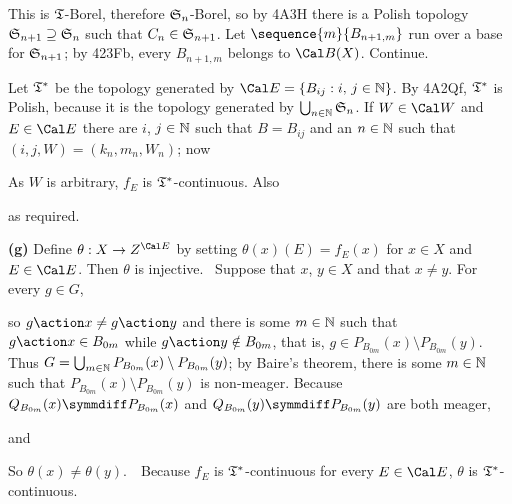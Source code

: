 {

\noindent This is $\frak T$-Borel, therefore $\frak S_n$-Borel, so by
4A3H there is a Polish topology $\frak S_{n+1}\supseteq\frak S_n$ such
that $C_n\in\frak S_{n+1}$.   Let $\sequence{m}{B_{n+1,m}}$ run over a
base for $\frak S_{n+1}$;  by 423Fb, every $B_{n+1,m}$ belongs to
$\Cal B(X)$.   Continue.

Let $\frak T^*$ be the topology generated by
$\Cal E=\{B_{ij}:i,\,j\in\Bbb N\}$.
By 4A2Qf, $\frak T^*$ is Polish, because it is the topology
generated by $\bigcup_{n\in\Bbb N}\frak S_n$.   If $W\in\Cal W$ and
$E\in\Cal E$ there are $i$, $j\in\Bbb N$ such that $B=B_{ij}$ and an
$n\in\Bbb N$ such that $(i,j,W)=(k_n,m_n,W_n)$;  now


\noindent As $W$ is arbitrary, $f_E$ is $\frak T^*$-continuous.   Also


\noindent as required.\ \Qed

\medskip

{\bf (g)} Define $\theta:X\to Z^{\Cal E}$ by setting
$\theta(x)(E)=f_E(x)$ for $x\in X$ and $E\in\Cal E$.   Then $\theta$ is
injective.   \Prf\ Suppose that $x$, $y\in X$ and that $x\ne y$.   For
every $g\in G$,


\noindent so $g\action x\ne g\action y$ and there is some $m\in\Bbb N$
such that $g\action x\in B_{0m}$ while $g\action y\notin B_{0m}$, that
is, $g\in P_{B_{0m}}(x)\setminus P_{B_{0m}}(y)$.   Thus
$G=\bigcup_{m\in\Bbb N}P_{B_{0m}}(x)\setminus P_{B_{0m}}(y)$;  by
Baire's theorem, there is some $m\in\Bbb N$ such that
$P_{B_{0m}}(x)\setminus P_{B_{0m}}(y)$ is non-meager.    Because
$Q_{B_{0m}}(x)\symmdiff P_{B_{0m}}(x)$ and
$Q_{B_{0m}}(y)\symmdiff P_{B_{0m}}(y)$ are both meager,


\noindent and


\noindent So $\theta(x)\ne\theta(y)$.\ \QeD\  Because $f_E$ is $\frak
T^*$-continuous for every $E\in\Cal E$, $\theta$ is
$\frak T^*$-continuous.

}
